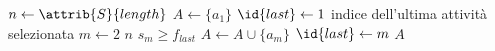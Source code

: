 \begin{codebox}
\li $n \gets \attrib{S}{length}$
\li	$A \gets \{a_1\}$
\li	$\id{last} \gets 1$
		\Comment indice dell'ultima attività selezionata
\li	\For $m \gets 2$ \To $n$
\li	\Do
		\If $s_m \geq f_{last}$
\li		\Then
			$A \gets A \cup \{a_m\}$
\li			$\id{last} \gets m$
		\End
	\End
\li	\Return $A$
\end{codebox}